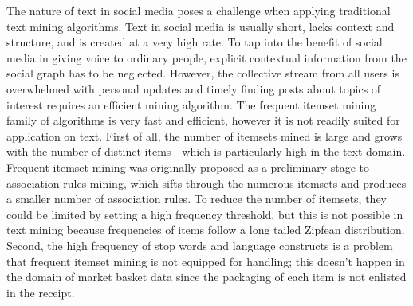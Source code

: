 \documentclass{sig-alternate}
\begin{document}
The nature of text in social media poses a challenge when applying traditional text mining algorithms. Text in social media is usually short, lacks context and structure, and is created at a very high rate. To tap into the benefit of social media in giving voice to ordinary people, explicit contextual information from the social graph has to be neglected. However, the collective stream from all users is overwhelmed with personal updates 
and timely finding posts about topics of interest requires an efficient mining algorithm.
The frequent itemset mining family of algorithms is very fast and efficient, however it is not readily suited for application on text. First of all, the number of itemsets mined is large and grows with the number of distinct items - which is particularly high in the text domain. 
Frequent itemset mining was originally proposed as a preliminary stage to association rules mining, which sifts through the numerous itemsets and produces a smaller number of association rules. To reduce the number of itemsets, they could be limited by setting a high frequency threshold, but this is not possible in text mining because frequencies of items follow a long tailed Zipfean distribution. %
Second, the high frequency of stop words and language constructs is a problem that frequent itemset mining is not equipped for handling; this doesn't happen in the domain of market basket data since the packaging of each item is not enlisted in the receipt.
\end{document}
